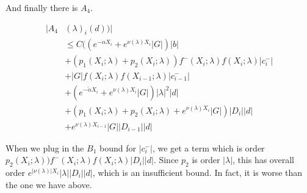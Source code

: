 \documentclass[12pt]{article}
\begin{document}
\begin{enumerate}
And finally there is $A_4$.

\begin{align*}
|A_4&(\lambda)_i(d))| \\
&\leq C ( (e^{-\alpha X_i} + e^{\nu(\lambda)X_i} |G| )|b| \\
&+ (p_1(X_i; \lambda) + p_2(X_i; \lambda) ) f^-(X_i; \lambda) f(X_i; \lambda) |c_i^-| \\
&+ |G| f(X_i; \lambda) f(X_{i-1}; \lambda) |c_{i-1}^-| \\
&+ (e^{-\tilde{\alpha} X_i} + e^{\nu(\lambda)X_i} |G| )|\lambda|^2 |d| \\
&+ (p_1(X_i; \lambda) + p_2(X_i; \lambda) + e^{\nu(\lambda)X_i} |G|)|D_i||d| \\
&+ e^{\nu(\lambda)X_{i-1}} |G| |D_{i-1}||d|
\end{align*}

When we plug in the $B_1$ bound for $|c_i^-|$, we get a term which is order $p_2(X_i; \lambda) ) f^-(X_i; \lambda) f(X_i; \lambda) |D_i| |d|$. Since $p_2$ is order $|\lambda|$, this has overall order $e^{|\nu(\lambda)|X_i} |\lambda| |D_i| |d|$, which is an insufficient bound. In fact, it is worse than the one we have above.


\end{enumerate}
\end{document}
